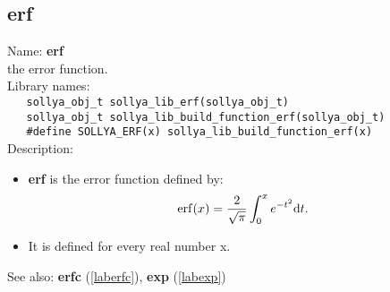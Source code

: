 \subsection{erf}
\label{laberf}
\noindent Name: \textbf{erf}\\
\phantom{aaa}the error function.\\[0.2cm]
\noindent Library names:\\
\verb|   sollya_obj_t sollya_lib_erf(sollya_obj_t)|\\
\verb|   sollya_obj_t sollya_lib_build_function_erf(sollya_obj_t)|\\
\verb|   #define SOLLYA_ERF(x) sollya_lib_build_function_erf(x)|\\[0.2cm]
\noindent Description: \begin{itemize}

\item \textbf{erf} is the error function defined by:
   $$\mathrm{erf}(x) = \frac{2}{\sqrt{\pi}} \int_0^x e^{-t^2} {\rm d}t.$$

\item It is defined for every real number x.
\end{itemize}
See also: \textbf{erfc} (\ref{laberfc}), \textbf{exp} (\ref{labexp})
